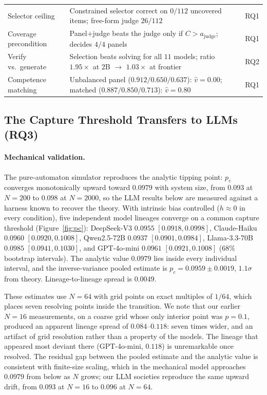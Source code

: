 \documentclass[manuscript,screen,review]{acmart}
\begin{document}
\begin{table}[t]
\begin{tabular}{@{}p{3.4cm}p{6.2cm}c@{}}
Selector ceiling & Constrained selector correct on $0/112$ uncovered items; free-form judge $26/112$ & RQ1 \\
Coverage precondition & Panel$+$judge beats the judge only if $C>a_{\mathrm{judge}}$; decides $4/4$ panels & RQ1 \\
Verify vs.\ generate & Selection beats solving for all $11$ models; ratio $1.95\times$ at $2$B $\to$ $1.03\times$ at frontier & RQ2 \\
Competence matching & Unbalanced panel ($0.912/0.650/0.637$): $\hat v{=}0.00$; matched ($0.887/0.850/0.713$): $\hat v{=}0.80$ & RQ1 \\
\bottomrule
\end{tabular}
\end{table}

\subsection{The Capture Threshold Transfers to LLMs (RQ3)}
\paragraph{Mechanical validation.} The pure-automaton simulator reproduces the
analytic tipping point: $p_c$ converges monotonically upward toward $0.0979$ with
system size, from $0.093$ at $N{=}200$ to $0.098$ at $N{=}2000$, so the LLM results
below are measured against a harness known to recover the theory.
\label{sec:pc}
With intrinsic bias controlled ($h\approx0$ in every condition), five independent
model lineages converge on a common capture threshold (Figure~\ref{fig:pc}):
DeepSeek-V3 $0.0955$ $[0.0918,0.0998]$, Claude-Haiku $0.0960$ $[0.0920,0.1008]$,
Qwen2.5-72B $0.0937$ $[0.0901,0.0984]$, Llama-3.3-70B $0.0985$ $[0.0941,0.1030]$,
and GPT-4o-mini $0.0961$ $[0.0921,0.1008]$ ($68\%$ bootstrap intervals). The
analytic value $0.0979$ lies inside every individual interval, and the
inverse-variance pooled estimate is $p_c = 0.0959 \pm 0.0019$, $1.1\sigma$ from
theory. Lineage-to-lineage spread is $0.0049$.

These estimates use $N{=}64$ with grid points on exact multiples of $1/64$, which
places seven resolving points inside the transition. We note that our earlier
$N{=}16$ measurements, on a coarse grid whose only interior point was $p{=}0.1$,
produced an apparent lineage spread of $0.084$--$0.118$: seven times wider, and an
artifact of grid resolution rather than a property of the models. The lineage that
appeared most deviant there (GPT-4o-mini, $0.118$) is unremarkable once resolved.
The residual gap between the pooled estimate and the analytic value is consistent
with finite-size scaling, which in the mechanical model approaches $0.0979$ from
below as $N$ grows; our LLM societies reproduce the same upward drift, from
$0.093$ at $N{=}16$ to $0.096$ at $N{=}64$.
\end{document}
